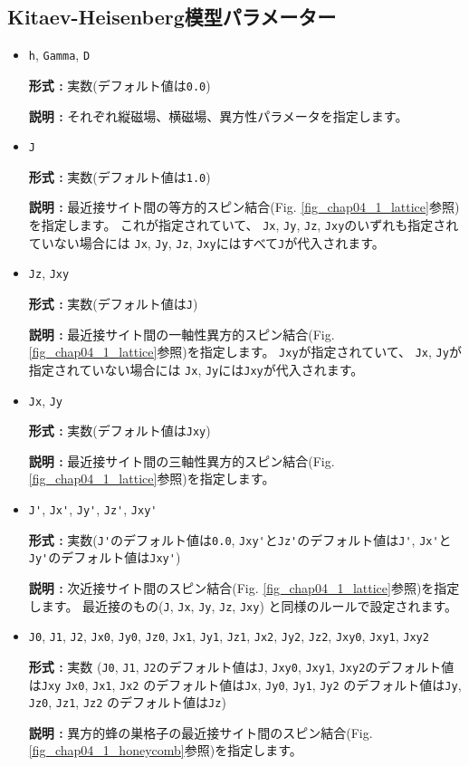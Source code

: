 \subsection{Kitaev-Heisenberg模型パラメーター}
\begin{itemize}
\item \verb|h|, \verb|Gamma|, \verb|D|

{\bf 形式 :} 実数(デフォルト値は\verb|0.0|)

{\bf 説明 :} それぞれ縦磁場、横磁場、異方性パラメータを指定します。

\item \verb|J|

{\bf 形式 :} 実数(デフォルト値は\verb|1.0|)

{\bf 説明 :} 最近接サイト間の等方的スピン結合(Fig. \ref{fig_chap04_1_lattice}参照)を指定します。
これが指定されていて、
\verb|Jx|, \verb|Jy|, \verb|Jz|, \verb|Jxy|のいずれも指定されていない場合には
\verb|Jx|, \verb|Jy|, \verb|Jz|, \verb|Jxy|にはすべて\verb|J|が代入されます。

\item \verb|Jz|, \verb|Jxy|

{\bf 形式 :} 実数(デフォルト値は\verb|J|)

{\bf 説明 :} 最近接サイト間の一軸性異方的スピン結合(Fig. \ref{fig_chap04_1_lattice}参照)を指定します。
\verb|Jxy|が指定されていて、
\verb|Jx|, \verb|Jy|が指定されていない場合には
\verb|Jx|, \verb|Jy|には\verb|Jxy|が代入されます。

\item \verb|Jx|, \verb|Jy|

{\bf 形式 :} 実数(デフォルト値は\verb|Jxy|)

{\bf 説明 :} 最近接サイト間の三軸性異方的スピン結合(Fig. \ref{fig_chap04_1_lattice}参照)を指定します。

\item \verb|J'|, \verb|Jx'|, \verb|Jy'|, \verb|Jz'|, \verb|Jxy'|

{\bf 形式 :} 実数(\verb|J'|のデフォルト値は\verb|0.0|, 
\verb|Jxy'|と\verb|Jz'|のデフォルト値は\verb|J'|,
\verb|Jx'|と\verb|Jy'|のデフォルト値は\verb|Jxy'|)

{\bf 説明 :} 次近接サイト間のスピン結合(Fig. \ref{fig_chap04_1_lattice}参照)を指定します。
最近接のもの(\verb|J|, \verb|Jx|, \verb|Jy|, \verb|Jz|, \verb|Jxy|)
と同様のルールで設定されます。

\item \verb|J0|, \verb|J1|, \verb|J2|, \verb|Jx0|, \verb|Jy0|, \verb|Jz0|, \verb|Jx1|, \verb|Jy1|, \verb|Jz1|, 
  \verb|Jx2|, \verb|Jy2|, \verb|Jz2|, \verb|Jxy0|, \verb|Jxy1|, \verb|Jxy2|

{\bf 形式 :} 実数 (\verb|J0|, \verb|J1|, \verb|J2|のデフォルト値は\verb|J|, 
\verb|Jxy0|, \verb|Jxy1|,  \verb|Jxy2|のデフォルト値は\verb|Jxy|
\verb|Jx0|, \verb|Jx1|, \verb|Jx2| のデフォルト値は\verb|Jx|,
\verb|Jy0|, \verb|Jy1|, \verb|Jy2| のデフォルト値は\verb|Jy|,
\verb|Jz0|, \verb|Jz1|, \verb|Jz2| のデフォルト値は\verb|Jz|)

{\bf 説明 :} 異方的蜂の巣格子の最近接サイト間のスピン結合(Fig. \ref{fig_chap04_1_honeycomb}参照)を指定します。

\end{itemize}

